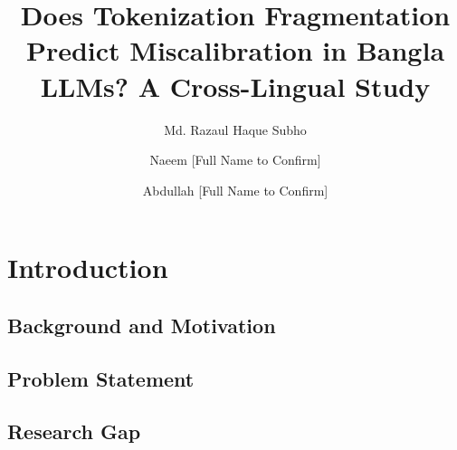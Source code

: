 \documentclass[runningheads]{llncs}
\begin{document}
\title{Does Tokenization Fragmentation Predict Miscalibration in Bangla LLMs? A Cross-Lingual Study}

\author{Md. Razaul Haque Subho \and Naeem [Full Name to Confirm] \and Abdullah [Full Name to Confirm]}

\maketitle

\begin{abstract}
\end{abstract}


\section{Introduction}
\subsection{Background and Motivation}

\subsection{Problem Statement}

\subsection{Research Gap}
\end{document}
